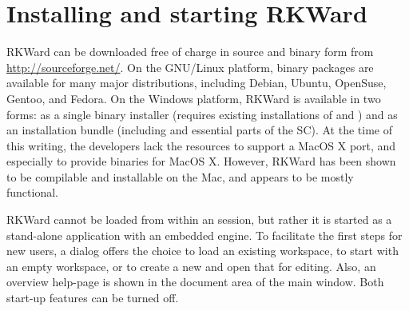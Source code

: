 \section{Installing and starting RKWard}
\label{sec:installing_starting_RKWard}
RKWard can be downloaded free of charge in source and binary form from
\url{http://sourceforge.net/}. On the GNU/Linux
platform, binary packages are available for many major distributions,
including Debian, Ubuntu, OpenSuse, Gentoo, and Fedora. On the Windows
platform, RKWard is available in two forms: as a single binary
installer (requires existing installations of
 and ) and
as an installation bundle (including  and
essential parts of the  SC). At the time of
this writing, the developers lack the resources to support a MacOS X
port, and especially to provide binaries for MacOS X. However, RKWard
has been shown to be compilable and installable on the Mac, and appears
to be mostly functional.

RKWard cannot be loaded from within an 
session, but rather it is started as a stand-alone application with an
embedded  engine. To facilitate the first
steps for new users, a dialog offers the choice to load an existing
workspace, to start with an empty workspace, or to create a new
 and open that for editing. Also, an overview help-page is
shown in the document area of the main window. Both start-up features
can be turned off.